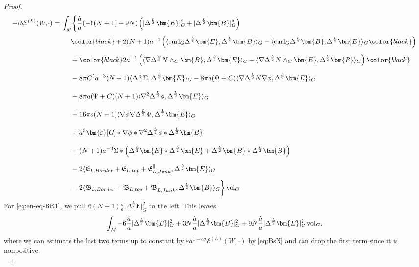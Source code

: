 \documentclass[11pt,leqno,textwidth=10cm]{amsart}
\numberwithin{equation}{section}
\theoremstyle{definition}
\theoremstyle{plain}
\newcommand{\1}{\mathbbm{1}}
\newcommand{\E}{\mathcal{E}}
\newcommand{\vol}[1]{{\text{\normalfont{vol}}}_{#1}}
\renewcommand{\epsilon}{\varepsilon}
\newcommand{\del}{\partial}
\newcommand{\Lap}{\Delta}
\newcommand{\curl}{\text{\normalfont{curl}}}
\newcommand{\RE}{\bm{E}}
\newcommand{\RB}{\bm{B}}
\newcommand{\epsilonLC}{\bm{\epsilon}}
\newcommand{\change}[1]{\color{black}#1\color{black}}
\begin{document}
\begin{proof}
\begin{subequations}
\begin{align}
-\del_t\E^{(L)}(W,\cdot)=&\,\int_M\biggr\{\frac{\dot{a}}a(-6(N+1)+9N)\left(\lvert\Lap^{\frac{L}2}\RE\rvert_G^2+\lvert\Lap^{\frac{L}2}\RB\rvert_G^2\right)\label{eq:en-eq-BR1}\\
&\,\phantom{\int_M}\change{+2(N+1)a^{-1}\left(\langle\curl_G\Lap^{\frac{L}2}\RE,\Lap^{\frac{L}2}\RB\rangle_G-\langle\curl_G\Lap^{\frac{L}2}\RB,\Lap^{\frac{L}2}\RE\rangle_G}\right)\label{eq:en-eq-BR2}\\
&\,\phantom{\int_M}+\change{2a^{-1}\left(\langle\nabla\Lap^\frac{L}2N\wedge_G\RB,\Lap^\frac{L}2\RE\rangle_G-\langle\nabla\Lap^{\frac{L}2}N\wedge_G\RE,\Lap^{\frac{L}2}\RB\rangle_G\right)}\label{eq:en-eq-BR3}\\
&\,\phantom{\int_M}-8\pi C^2a^{-3}(N+1)\langle\Lap^\frac{L}2\Sigma,\Lap^\frac{L}2\RE\rangle_G-8\pi a(\Psi+C)\langle\nabla\Lap^{\frac{L}2}N\nabla\phi,\Lap^\frac{L}2\RE\rangle_G\label{eq:en-eq-BR4}\\
&\,\phantom{\int_M}-8\pi a(\Psi+C)(N+1)\langle\nabla^2\Lap^{\frac{L}2}\phi,\Lap^{\frac{L}2}\RE\rangle_G\label{eq:en-eq-BR5}\\
&\,\phantom{\int_M}+16\pi a(N+1)\langle \nabla\phi\nabla\Lap^{\frac{L}2}\Psi,\Lap^\frac{L}2\RE\rangle_G\label{eq:en-eq-BR6}\\
&\,\phantom{\int_M}+a^3\epsilonLC[G]\ast\nabla\phi\ast\nabla^2\Lap^{\frac{L}2}\phi\ast\Lap^{\frac{L}2}\RB\label{eq:en-eq-BR7}\\
&\,\phantom{\int_M} +(N+1)a^{-3}\Sigma\ast\left(\Lap^{\frac{L}2}\RE\ast\Lap^{\frac{L}2}\RE+\Lap^{\frac{L}2}\RB\ast\Lap^{\frac{L}2}\RB\right)\label{eq:en-eq-BR8}\\
&\,\phantom{\int_M} -2\langle\mathfrak{E}_{L,Border}+\mathfrak{E}_{L,top}+\mathfrak{E}_{L,Junk}^\parallel,\Lap^{\frac{L}2}\RE\rangle_G\label{eq:en-eq-BR9}\\
&\,\phantom{\int_M} -2\langle\mathfrak{B}_{L,Border}+\mathfrak{B}_{L,top}+\mathfrak{B}_{L,Junk}^\parallel,\Lap^{\frac{L}2}\RB\rangle_G\biggr\}\,\vol{G}\label{eq:en-eq-BR10}
\end{align}
\end{subequations}
For \eqref{eq:en-eq-BR1}, we pull $6(N+1)\frac{\dot{a}}a\lvert\Lap^{\frac{L}2}\RE\rvert_G^2$ to the left. This leaves
\[\int_M-6\frac{\dot{a}}a\lvert\Lap^\frac{L}2\RB\rvert_G^2+3N\frac{\dot{a}}a\lvert\Lap^\frac{L}2\RB\rvert_G^2+9N\frac{\dot{a}}a\lvert\Lap^\frac{L}2\RE\rvert_G^2\,\vol{G},\]
where we can estimate the last two terms up to constant by $\epsilon a^{1-c\sigma}\E^{(L)}(W,\cdot)$ by \eqref{eq:BsN} and can drop the first term since it is nonpositive.\\

\end{proof}
\end{document}
